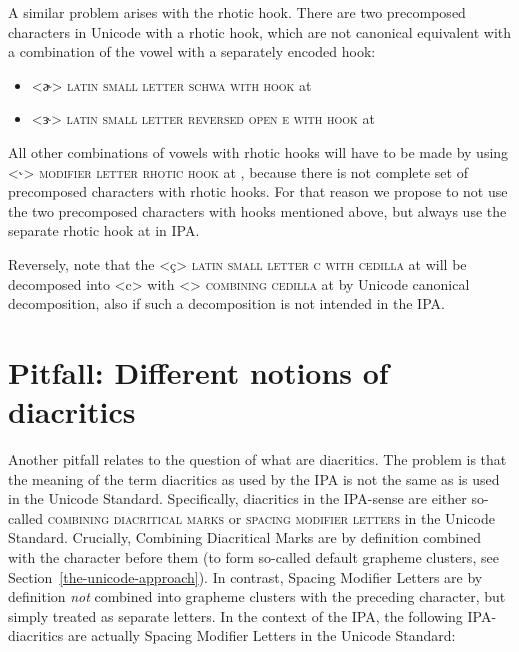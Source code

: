 A similar problem arises with the rhotic hook. There are two precomposed
characters in Unicode with a rhotic hook, which are not canonical equivalent 
with a combination of the vowel with a separately encoded hook:
\begin{itemize}
  \item[] <ɚ> \textsc{latin small letter schwa with hook} at 
  \item[] <ɝ> \textsc{latin small letter reversed open e with hook} at 
\end{itemize}
          
All other combinations of vowels with rhotic hooks will have to be made by using
<{\large ˞}> \textsc{modifier letter rhotic hook} at , because there
is not complete set of precomposed characters with rhotic hooks. For that reason
we propose to not use the two precomposed characters with hooks mentioned above,
but always use the separate rhotic hook at  in IPA.\@

Reversely, note that the <ç> \textsc{latin small letter c with cedilla} at
 will be decomposed into <c> with <> \textsc{combining
cedilla} at  by Unicode canonical decomposition, also if such a
decomposition is not intended in the IPA.\@

\section{Pitfall: Different notions of diacritics}
\label{pitfall-different-notions-of-diacritics}

Another pitfall relates to the question of what are diacritics. The problem is that
the meaning of the term diacritics as used by the IPA is not the same as is used
in the Unicode Standard. Specifically, diacritics in the IPA-sense are either
so-called \textsc{combining diacritical marks} or \textsc{spacing modifier
letters} in the Unicode Standard. Crucially, Combining Diacritical Marks are by
definition combined with the character before them (to form so-called default
grapheme clusters, see Section~\ref{the-unicode-approach}). In contrast, Spacing
Modifier Letters are by definition \emph{not} combined into grapheme clusters
with the preceding character, but simply treated as separate letters. In the
context of the IPA, the following IPA-diacritics are actually Spacing Modifier
Letters in the Unicode Standard:

